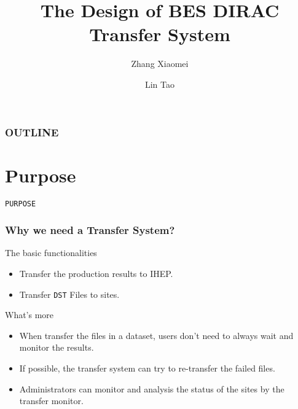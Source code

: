 \documentclass[19pt]{beamer}
\begin{document}
\title{The Design of BES DIRAC Transfer System}
\author{
    Zhang Xiaomei 
    \and
    Lin Tao 
}


\maketitle

\begin{frame}
    \frametitle{OUTLINE}
    \tableofcontents
\end{frame}


\section{Purpose}

\begin{frame}
    \begin{center}
        \LARGE \tt{PURPOSE}
    \end{center}
\end{frame}

\begin{frame}
    \frametitle{Why we need a Transfer System?}
    \begin{block}{The basic functionalities}
        \begin{itemize}
            \item Transfer the production results to IHEP.
            \item Transfer {\tt DST} Files to sites.
        \end{itemize}
    \end{block}
    \begin{block}{What's more}
        \begin{itemize}
            \item When transfer the files in a dataset, users
                  don't need to always wait and monitor the results.
            \item If possible, the transfer system can try to re-transfer
                  the failed files.
            \item Administrators can monitor and analysis the status of the 
                  sites by the transfer monitor.
        \end{itemize}
    \end{block}
\end{frame}
\end{document}
